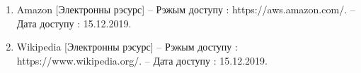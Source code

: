 
\begin{enumerate}[{label=\arabic{*}}]
    \item Amazon
          [Электронны рэсурс] --
          Рэжым доступу : 
          https://aws.amazon.com/. --
          Дата доступу : 15.12.2019.
    \item Wikipedia
          [Электронны рэсурс] --
          Рэжым доступу : 
          https://www.wikipedia.org/. --
          Дата доступу : 15.12.2019.
\end{enumerate}

